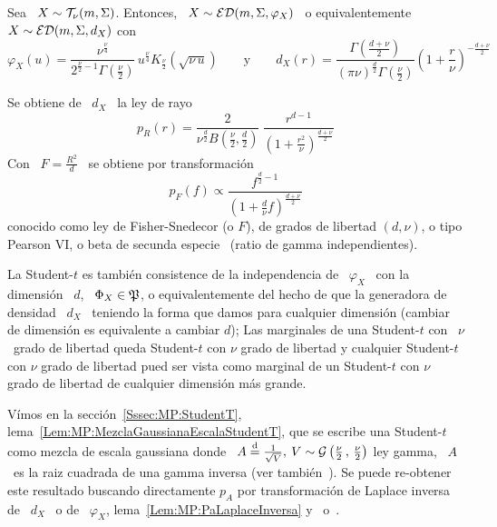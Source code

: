 \begin{ejemplo}
%
  Sea \ $X \sim \mathcal{T}_\nu(m,\Sigma)$.  Entonces, \ $X \sim \mathcal{ED}(m,\Sigma,\varphi_X)$
  \ o equivalentemente \ $X \sim \mathcal{ED}(m,\Sigma,d_X)$ con
  \[
  \varphi_X(u)   =  \frac{\nu^{\frac{\nu}{4}}}{2^{\frac{\nu}{2}-1}  \Gamma\left(
      \frac{\nu}{2}   \right)}   \,  u^{\frac{\nu}{4}}   K_{\frac{\nu}{2}}\left(
    \sqrt{\nu \,  u} \right) \qquad \mbox{y} \qquad  d_X(r) = \frac{\Gamma\left(
      \frac{d+\nu}{2}      \right)}{(\pi     \nu)^{\frac{d}{2}}     \Gamma\left(
      \frac{\nu}{2}    \right)}   \left(    1    +   \frac{r}{\nu}    \right)^{-
    \frac{d+\nu}{2}}
  \]

  Se obtiene de \ $d_X$ \ la ley de rayo
  \[
  p_R(r)  =  \frac{2}{\nu^{\frac{d}{2}}   B\left(  \frac{\nu}{2}  ,  \frac{d}{2}
    \right)}      \:     \frac{r^{d-1}}{\left(      1      +     \frac{r^2}{\nu}
    \right)^{\frac{d+\nu}{2}}}
  \]
  Con \ $F = \frac{R^2}{d}$ \ se obtiene por transformaci\'on
  \[
  p_F(f)   \propto   \frac{f^{\frac{d}{2}-1}}{\left(   1   +   \frac{d}{\nu}   f
    \right)^{\frac{d+\nu}{2}}}
  \]
  conocido como ley de Fisher-Snedecor (o $F$), de grados de libertad $(d,\nu)$,
  o tipo Pearson VI, o  beta de secunda especie~\cite{JohKot95:v2, Muk00, Bre88,
    IbaPer12} (ratio de gamma independientes).

  La Student-$t$ es tambi\'en consistence de la independencia de \ $\varphi_X$ \
  con la dimensi\'on \ $d$, \  $\Phi_X \in \mathfrak{P}$, o equivalentemente del hecho de
  que  la generadora de  densidad \  $d_X$ \  teniendo la  forma que  damos para
  cualquier dimensi\'on  (cambiar de dimensi\'on es equivalente  a cambiar $d$);
  Las  marginales de  una Student-$t$  con  \ $\nu$  \ grado  de libertad  queda
  Student-$t$  con $\nu$  grado de  libertad y  cualquier Student-$t$  con $\nu$
  grado de  libertad pued ser  vista como marginal  de un Student-$t$  con $\nu$
  grado de libertad de cualquier dimensi\'on m\'as grande.

  V\'imos           en           la           secci\'on~\ref{Sssec:MP:StudentT},
  lema~\ref{Lem:MP:MezclaGaussianaEscalaStudentT},    que    se   escribe    una
  Student-$t$   como   mezcla   de   escala   gaussiana  donde   \   $A   \stackrel{\mathrm{d}}{=}
  \frac{1}{\sqrt{V}},  \: V \sim  \mathcal{G}\left( \frac{\nu}{2}  \, ,  \, \frac{\nu}{2}
  \right)$ ley gamma, \ie \ $A$ \  es la raiz cuadrada de una gamma inversa (ver
  tambi\'en~\cite{FanKot90,  KotNad04}).   Se  puede re-obtener  este  resultado
  buscando directamente $p_A$ por transformaci\'on de Laplace inversa de \ $d_X$
  \  o  de  \  $\varphi_X$,  lema~\ref{Lem:MP:PaLaplaceInversa}  y~\cite[Cap.~5,
  Tab.~A.5.1, Ec.~14]{Pou10} o~\cite[Cap.~2, Tab.~2.3, Ec.~14]{Pou99}.
%
\end{ejemplo}

